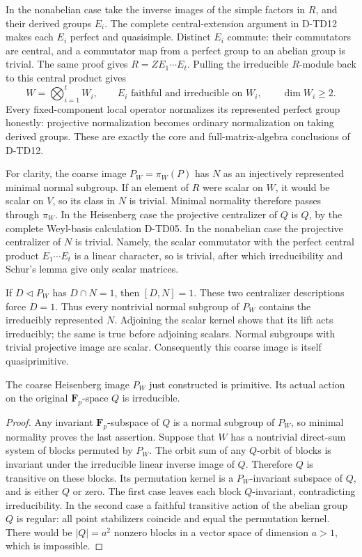 In the nonabelian case take the inverse images of the simple
factors in \(R\), and their derived groups \(E_i\).
The complete central-extension argument in D-TD12 makes each
\(E_i\) perfect and quasisimple. Distinct \(E_i\) commute:
their commutators are central, and a commutator map from a
perfect group to an abelian group is trivial. The same proof
gives \(R=Z E_1\cdots E_t\). Pulling the irreducible
\(R\)-module back to this central product gives
\[
 W=\bigotimes_{i=1}^t W_i,\qquad
 E_i\text{ faithful and irreducible on }W_i,\qquad
 \dim W_i\ge2.
 \tag{QPX.6}
\]
Every fixed-component local operator normalizes its represented
perfect group honestly: projective normalization becomes ordinary
normalization on taking derived groups. These are exactly the
core and full-matrix-algebra conclusions of D-TD12.

For clarity, the coarse image \(P_W=\pi_W(P)\) has \(N\)
as an injectively represented minimal normal subgroup.
If an element of \(R\) were scalar on \(W\), it would be
scalar on \(V\), so its class in \(N\) is trivial.
Minimal normality therefore passes through \(\pi_W\).
In the Heisenberg case the projective centralizer of \(Q\)
is \(Q\), by the complete Weyl-basis calculation D-TD05.
In the nonabelian case the projective centralizer of \(N\)
is trivial. Namely, the scalar commutator with the perfect
central product \(E_1\cdots E_t\) is a linear character,
so is trivial, after which irreducibility and Schur's lemma
give only scalar matrices.

If \(D\triangleleft P_W\) has \(D\cap N=1\), then
\([D,N]=1\). These two centralizer descriptions force \(D=1\).
Thus every nontrivial normal subgroup of \(P_W\) contains
the irreducibly represented \(N\). Adjoining the scalar
kernel shows that its lift acts irreducibly; the same is
true before adjoining scalars. Normal subgroups with trivial
projective image are scalar. Consequently this coarse image
is itself quasiprimitive.

\begin{lemma}
The coarse Heisenberg image \(P_W\) just constructed is primitive.
Its actual action on the original \(\mathbf F_p\)-space \(Q\)
is irreducible.
\end{lemma}

\begin{proof}
Any invariant \(\mathbf F_p\)-subspace of \(Q\) is a normal
subgroup of \(P_W\), so minimal normality proves the last
assertion. Suppose that \(W\) has a nontrivial direct-sum
system of blocks permuted by \(P_W\). The orbit sum of
any \(Q\)-orbit of blocks is invariant under the irreducible
linear inverse image of \(Q\). Therefore \(Q\) is transitive
on these blocks. Its permutation kernel is a \(P_W\)-invariant
subspace of \(Q\), and is either \(Q\) or zero. The first
case leaves each block \(Q\)-invariant, contradicting
irreducibility. In the second case a faithful transitive
action of the abelian group \(Q\) is regular: all point
stabilizers coincide and equal the permutation kernel.
There would be \(|Q|=a^2\) nonzero blocks in a vector space
of dimension \(a>1\), which is impossible.
\end{proof}

